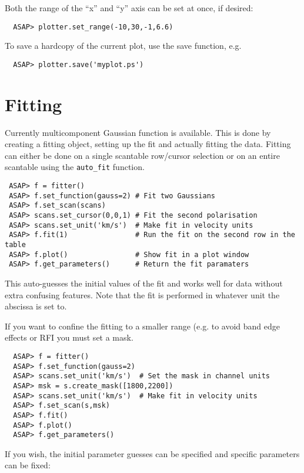 \documentclass[11pt]{article}
\newcommand{\cmd}[1]{{\tt #1}}
\begin{document}
Both the range of the ``x'' and ``y'' axis can be set at once, if desired:

\begin{verbatim}
  ASAP> plotter.set_range(-10,30,-1,6.6)
\end{verbatim}

To save a hardcopy of the current plot, use the save function, e.g.

\begin{verbatim}
  ASAP> plotter.save('myplot.ps')
\end{verbatim}

\section{Fitting}

Currently multicomponent Gaussian function is available. This is done
by creating a fitting object, setting up the fit and actually fitting
the data. Fitting can either be done on a single scantable row/cursor
selection or on an entire scantable using the \cmd{auto\_fit} function.

\begin{verbatim}
 ASAP> f = fitter()
 ASAP> f.set_function(gauss=2) # Fit two Gaussians
 ASAP> f.set_scan(scans)
 ASAP> scans.set_cursor(0,0,1) # Fit the second polarisation
 ASAP> scans.set_unit('km/s')  # Make fit in velocity units
 ASAP> f.fit(1)                # Run the fit on the second row in the table
 ASAP> f.plot()                # Show fit in a plot window
 ASAP> f.get_parameters()      # Return the fit paramaters
\end{verbatim}

This auto-guesses the initial values of the fit and works well for data
without extra confusing features. Note that the fit is performed in
whatever unit the abscissa is set to.

If you want to confine the fitting to a smaller range (e.g. to avoid
band edge effects or RFI you must set a mask.

\begin{verbatim}
  ASAP> f = fitter()
  ASAP> f.set_function(gauss=2)
  ASAP> scans.set_unit('km/s')  # Set the mask in channel units
  ASAP> msk = s.create_mask([1800,2200])
  ASAP> scans.set_unit('km/s')  # Make fit in velocity units
  ASAP> f.set_scan(s,msk)
  ASAP> f.fit()
  ASAP> f.plot()
  ASAP> f.get_parameters()
\end{verbatim}

If you wish, the initial parameter guesses can be specified and
specific parameters can be fixed:
\end{document}

